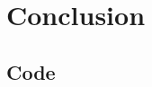 \documentclass{sfuthesis}
\theoremstyle{plain}
\theoremstyle{definition}
\begin{document}
\chapter{Conclusion}




%
%
%
%
%

\backmatter%
	
	

\begin{appendices} %
	\chapter{Code}
\end{appendices}
\end{document}
